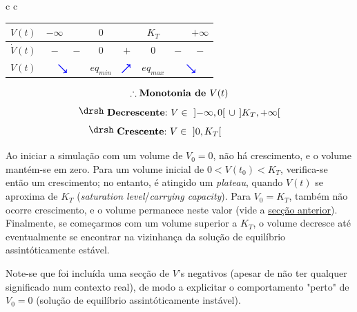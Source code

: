 \begin{tabular}{c c}
\begin{minipage}[t]{0.5\textwidth}
\begin{minipage}{1\linewidth}
                \label{tab:P3-monotonia}
            \end{minipage}
            \renewcommand\arraystretch{1.5}
            \hspace*{-0.5em}\begin{tabular}{*{8}{c}}
                \toprule
                $V(t)$ & $-\infty$ & & $0$ & & $K_T$ & & $+\infty$ \\
                \midrule
                $\dot{V}(t)$ & $-$ & $-$ & 0 & $+$ & 0 & $-$ & $-$ \\
                $V(t)$ & \multicolumn{2}{c}{$\color{blue} \pmb{\searrow}$} & $eq_{min}$ & $\color{blue} \pmb{\nearrow}$ & $eq_{max}$ & \multicolumn{2}{c}{$\color{blue} \pmb{\searrow}$} \\
                \bottomrule
            \end{tabular}
            \vspace{0.3em}
            \[ \therefore \text{\textbf{Monotonia de }} V(t) \]
            \[ \raisebox{0.2 em}{$\drsh$}\ \text{\textbf{Decrescente}:}\ V \in\ \left]-\infty, 0\right[\, \cup\, \left]K_T, +\infty\right[ \]
            \vspace{-1.7em}
            \[ \hspace*{-5em} \raisebox{0.2 em}{$\drsh$}\ \text{\textbf{Crescente}:}\ V \in\ \left]0, K_T\right[ \]      
    \end{minipage}
\end{tabular}

Ao iniciar a simulação com um volume de $V_0 = 0$, não há crescimento, e o volume mantém-se em zero. Para um volume inicial de $0<V(t_0)<K_T$, verifica-se então um crescimento; no entanto, é atingido um \textit{plateau}, quando $V(t)$ se aproxima de $K_T$ (\textit{saturation level}/\textit{carrying capacity}). Para $V_0 = K_T$, também não ocorre crescimento, e o volume permanece neste valor (vide a \hyperref[subsubsec:P3a]{secção anterior}). Finalmente, se começarmos com um volume superior a $K_T$, o volume decresce até eventualmente se encontrar na vizinhança da solução de equilíbrio assintóticamente estável.

Note-se que foi incluída uma secção de $V$'s negativos (apesar de não ter qualquer significado num contexto real), de modo a explicitar o comportamento "perto" de $V_0 = 0$ (solução de equilíbrio assintóticamente instável).

